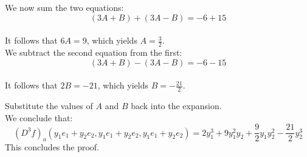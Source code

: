 \documentclass[11pt,a4paper]{article}
\theoremstyle{definition}
\theoremstyle{plain}
\theoremstyle{remark}
\begin{document}
We now sum the two equations:
$$(3A + B) + (3A - B) = -6 + 15$$\\
It follows that $6A = 9$, which yields $A = \frac{3}{2}$.\\
We subtract the second equation from the first:\\
$$(3A + B) - (3A - B) = -6 - 15$$\\
It follows that $2B = -21$, which yields $B = -\frac{21}{2}$.

\noindent Substitute the values of $A$ and $B$ back into the expansion.\\
We conclude that:
$$(D^3f)_a(y_1e_1 + y_2e_2, y_1e_1 + y_2e_2, y_1e_1 + y_2e_2) = 2y_1^3 + 9y_1^2y_2 + \frac{9}{2}y_1y_2^2 - \frac{21}{2}y_2^3$$
This concludes the proof.
\end{document}
